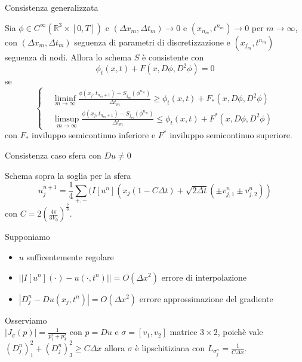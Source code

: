 \begin{frame}{Consistenza generalizzata}
  \begin{definizione}[Consistenza]
    Sia $\phi\in C^{\infty}(\mathbb{R}^3\times[0,T])$ e $(\Delta
    x_m,\Delta t_m)\to 0$ e  $(x_{n_m},t^{n_m})\to 0$  per
    $m\to\infty$, con $(\Delta x_m,\Delta t_m)$  seguenza di
    parametri di discretizzazione e $(x_{j_m},t^{n_m})$ seguenza di
    nodi. Allora lo schema $S$ è consistente con
    \[
    \phi_t(x,t)+F(x,D\phi,D^2\phi)=0
    \]
    se
    \[
    \left\{
    \begin{aligned}
      &\liminf_{m\to\infty}\frac{\phi(x_j,t_{n_m+1})-S_{j_m}(\phi^{n_m})}{\Delta
        t_m}\geq\phi_t(x,t)+F_*(x,D\phi,D^2\phi)
        \\
       &\limsup_{m\to\infty}\frac{\phi(x_j,t_{n_m+1})-S_{j_m}(\phi^{n_m})}{\Delta
          t_m}\leq\phi_t(x,t)+F^*(x,D\phi,D^2\phi)
    \end{aligned}
    \right.
    \]
    con $F_*$ inviluppo semicontinuo inferiore e $F^*$ inviluppo
    semicontinuo superiore.
  \end{definizione}
\end{frame}

\begin{frame}{Consistenza caso sfera con $Du\neq 0$}
  \begin{alertblock}{Schema sopra la soglia per la sfera}
   \[
     u_j^{n+1}=\frac{1}{4}\sum_{+,-}(I[u^n](x_j(1-C\Delta
     t)+\sqrt{2\Delta t}(\pm v_{j,1}^n\pm v_{j,2}^n))
    \]
    con $C=2\left(\frac{4\pi}{3V_0}\right)^\frac{2}{3}$.
  \end{alertblock}
  Supponiamo
  \begin{itemize}
    \item $u$ sufficentemente regolare
    \item $||I[u^n](\cdot)-u(\cdot,t^n)||=O(\Delta x^2)$ errore di
      interpolazione 
    \item $|D_j^n-Du(x_j,t^n)|=O(\Delta x^2)$ errore approssimazione
      del gradiente
   \end{itemize}
  Osserviamo \\ 
      $|J_{\sigma}(p)|=\frac{1}{p_1^2+p_3^2}$ con $p=Du$ e
      $\sigma=[v_1,v_2]$ matrice $3\times 2$,  poichè vale
      $(D_j^n)_1^2+(D_j^n)_3^2\geq C\Delta x$ allora $\sigma$ è
      lipschitiziana con $L_{\sigma_j^n}=\frac{1}{C\Delta x}$.  
 \end{frame}

